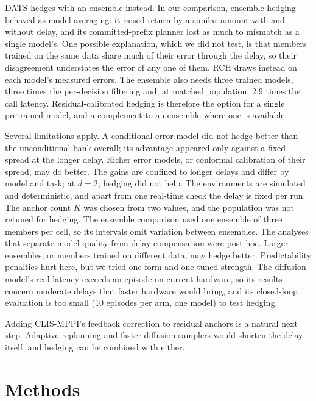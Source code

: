 \documentclass[pdflatex,sn-nature]{sn-jnl}%
\begin{document}
DATS\cite{chen2020dats} hedges with an ensemble instead. In our comparison, ensemble hedging behaved as model averaging: it raised return by a similar amount with and without delay, and its committed-prefix planner lost as much to mismatch as a single model's. One possible explanation, which we did not test, is that members trained on the same data share much of their error through the delay, so their disagreement understates the error of any one of them. RCH draws instead on each model's measured errors. The ensemble also needs three trained models, three times the per-decision filtering and, at matched population, 2.9 times the call latency. Residual-calibrated hedging is therefore the option for a single pretrained model, and a complement to an ensemble where one is available.

Several limitations apply. A conditional error model did not hedge better than the unconditional bank overall; its advantage appeared only against a fixed spread at the longer delay. Richer error models, or conformal calibration of their spread, may do better. The gains are confined to longer delays and differ by model and task; at $d=2$, hedging did not help. The environments are simulated and deterministic, and apart from one real-time check the delay is fixed per run. The anchor count $K$ was chosen from two values, and the population was not retuned for hedging. The ensemble comparison used one ensemble of three members per cell, so its intervals omit variation between ensembles. The analyses that separate model quality from delay compensation were post hoc. Larger ensembles, or members trained on different data, may hedge better. Predictability penalties hurt here, but we tried one form and one tuned strength. The diffusion model's real latency exceeds an episode on current hardware, so its results concern moderate delays that faster hardware would bring, and its closed-loop evaluation is too small (10 episodes per arm, one model) to test hedging.

Adding CLIS-MPPI's feedback correction\cite{liu2026clis} to residual anchors is a natural next step. Adaptive replanning\cite{cheng2026adarep} and faster diffusion samplers\cite{song2021ddim,chen2024diffusionforcing} would shorten the delay itself, and hedging can be combined with either.

\section{Methods}\label{sec:methods}
\end{document}
